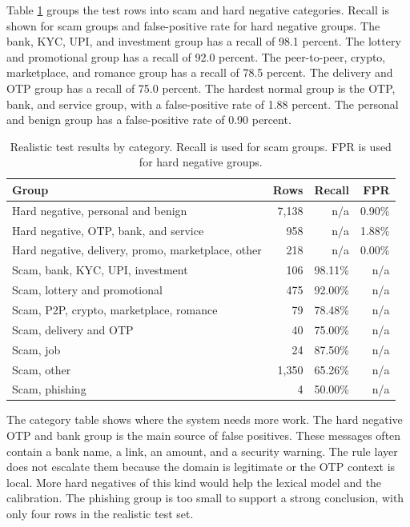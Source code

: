 \documentclass[11pt]{article}
\begin{document}
Table \ref{tab:category} groups the test rows into scam and hard negative categories. Recall is shown for scam groups and false-positive rate for hard negative groups. The bank, KYC, UPI, and investment group has a recall of 98.1 percent. The lottery and promotional group has a recall of 92.0 percent. The peer-to-peer, crypto, marketplace, and romance group has a recall of 78.5 percent. The delivery and OTP group has a recall of 75.0 percent. The hardest normal group is the OTP, bank, and service group, with a false-positive rate of 1.88 percent. The personal and benign group has a false-positive rate of 0.90 percent.

\begin{table}[htbp]
\centering
\small
\caption{Realistic test results by category. Recall is used for scam groups. FPR is used for hard negative groups.}
\label{tab:category}
\begin{tabularx}{\textwidth}{Xrrr}
\toprule
Group & Rows & Recall & FPR \\
\midrule
Hard negative, personal and benign & 7,138 & n/a & 0.90\% \\
Hard negative, OTP, bank, and service & 958 & n/a & 1.88\% \\
Hard negative, delivery, promo, marketplace, other & 218 & n/a & 0.00\% \\
Scam, bank, KYC, UPI, investment & 106 & 98.11\% & n/a \\
Scam, lottery and promotional & 475 & 92.00\% & n/a \\
Scam, P2P, crypto, marketplace, romance & 79 & 78.48\% & n/a \\
Scam, delivery and OTP & 40 & 75.00\% & n/a \\
Scam, job & 24 & 87.50\% & n/a \\
Scam, other & 1,350 & 65.26\% & n/a \\
Scam, phishing & 4 & 50.00\% & n/a \\
\bottomrule
\end{tabularx}
\end{table}

The category table shows where the system needs more work. The hard negative OTP and bank group is the main source of false positives. These messages often contain a bank name, a link, an amount, and a security warning. The rule layer does not escalate them because the domain is legitimate or the OTP context is local. More hard negatives of this kind would help the lexical model and the calibration. The phishing group is too small to support a strong conclusion, with only four rows in the realistic test set.
\end{document}
